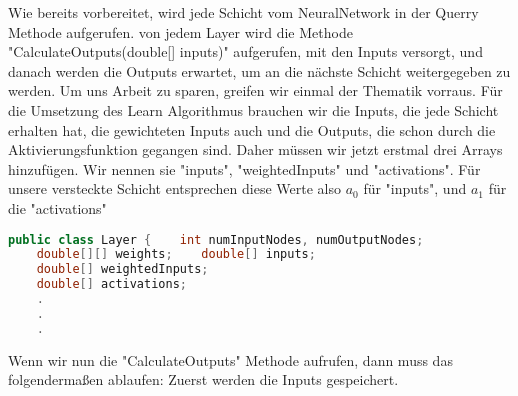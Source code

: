 \documentclass[12pt]{article}
\begin{document}
Wie bereits vorbereitet, wird jede Schicht vom NeuralNetwork in der Querry Methode aufgerufen. von jedem Layer wird die Methode "CalculateOutputs(double[] inputs)" aufgerufen, mit den Inputs versorgt, und danach werden die Outputs erwartet, um an die nächste Schicht weitergegeben zu werden.
Um uns Arbeit zu sparen, greifen wir einmal der Thematik vorraus. Für die Umsetzung des Learn Algorithmus brauchen wir die Inputs, die jede Schicht erhalten hat, die gewichteten Inputs auch und die Outputs, die schon durch die Aktivierungsfunktion gegangen sind. Daher müssen wir jetzt erstmal drei Arrays hinzufügen. Wir nennen sie "inputs", "weightedInputs" und "activations". Für unsere versteckte Schicht entsprechen diese Werte also $a_0$ für "inputs", und $a_1$ für die "activations"\begin{lstlisting}[language=Java]
public class Layer {    int numInputNodes, numOutputNodes;
    double[][] weights;    double[] inputs;
    double[] weightedInputs;
    double[] activations;
    .
    .
    .
\end{lstlisting}Wenn wir nun die "CalculateOutputs" Methode aufrufen, dann muss das folgendermaßen ablaufen:
Zuerst werden die Inputs gespeichert.
\end{document}
